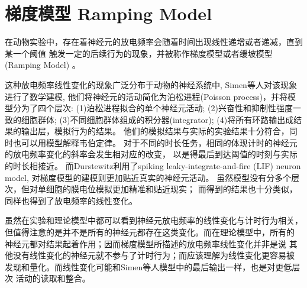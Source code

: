 \section{梯度模型 Ramping Model}

在动物实验中，存在着神经元的放电频率会随着时间出现线性递增或者递减，直到某一个阈值
触发一定的后续行为的现象，并被称作梯度模型或者缓坡模型(Ramping Model)
\cite{durstewitz2003self,simen2011model,paton2018neural}。

这种放电频率线性变化的现象广泛分布于动物的神经系统中\cite{durstewitz2003self,simen2011model},
Simen等人对该现象进行了数学建模,
他们将神经元的活动简化为泊松进程(Poisson process)，并将模型分为了四个层次:
(1)泊松进程拟合的单个神经元活动; (2)兴奋性和抑制性强度一致的细胞群体;
(3)不同细胞群体组成的积分器(integrator); (4)将所有环路输出成结果的输出层，模拟行为的结果\cite{simen2011model}。
他们的模拟结果与实际的实验结果十分符合，同时也可以用模型解释韦伯定律。
对于不同的时长任务，相同的体现计时的神经元的放电频率变化的斜率会发生相对应的改变，
以是得最后到达阈值的时刻与实际的时长相接近。
而Durstewitz利用了spiking leaky-integrate-and-fire (LIF) neuron model,
对梯度模型的建模则更加贴近真实的神经元活动\cite{durstewitz2003self}。
虽然模型没有分多个层次，但对单细胞的膜电位模拟更加精准和贴近现实；
而得到的结果也十分类似，同样也得到了放电频率的线性变化。

虽然在实验和理论模型中都可以看到神经元放电频率的线性变化与计时行为相关，
但值得注意的是并不是所有的神经元都存在这类变化。而在理论模型中，所有的
神经元都对结果起着作用；因而梯度模型所描述的放电频率线性变化并非是说
其他没有线性变化的神经元就不参与了计时行为；而应该理解为线性变化更容易被
发现和量化。而线性变化可能和Simen等人模型中的最后输出一样，也是对更低层次
活动的读取和整合。

